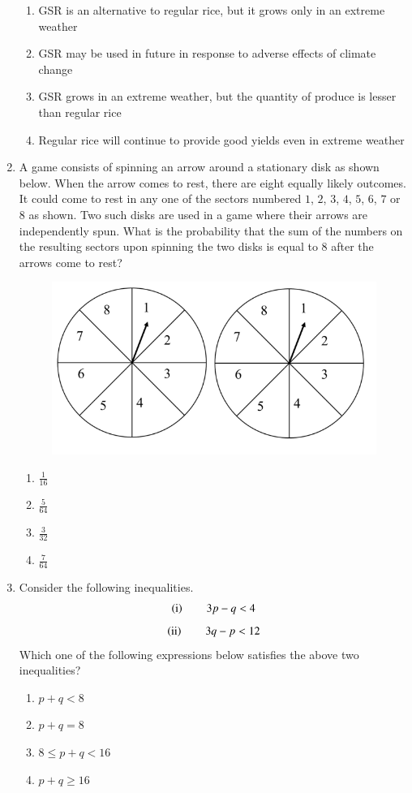 \documentclass[journal,12pt,onecolumn]{IEEEtran}
\theoremstyle{remark}
\begin{document}
\begin{enumerate}
\hfill{}
\begin{enumerate}
\item GSR is an alternative to regular rice, but it grows only in an extreme weather
\item GSR may be used in future in response to adverse effects of climate change
\item GSR grows in an extreme weather, but the quantity of produce is lesser than regular rice
\item Regular rice will continue to provide good yields even in extreme weather
\end{enumerate}

\item A game consists of spinning an arrow around a stationary disk as shown below. When the arrow comes to rest, there are eight equally likely outcomes. It could come to rest in any one of the sectors numbered $1$, $2$, $3$, $4$, $5$, $6$, $7$ or $8$ as shown. Two such disks are used in a game where their arrows are independently spun. What is the probability that the sum of the numbers on the resulting sectors upon spinning the two disks is equal to $8$ after the arrows come to rest?

\hfill{}
\begin{figure}[H]
\includegraphics[width = 0.5\columnwidth]{q7}
\caption*{}
\label{q7}
\end{figure}
\begin{enumerate}
\item $\frac{1}{16}$
\item $\frac{5}{64}$
\item $\frac{3}{32}$
\item $\frac{7}{64}$
\end{enumerate}

\item Consider the following inequalities.
$$
\left(\text{i}\right) \qquad 3p-q<4
$$
$$
\left(\text{ii}\right)\qquad 3q-p<12
$$
Which one of the following expressions below satisfies the above two inequalities?

\hfill{}
\begin{enumerate}
\item $p+q<8$
\item $p+q=8$
\item $8\le p+q<16$
\item $p+q\ge16$
\end{enumerate}


\end{enumerate}
\end{document}
